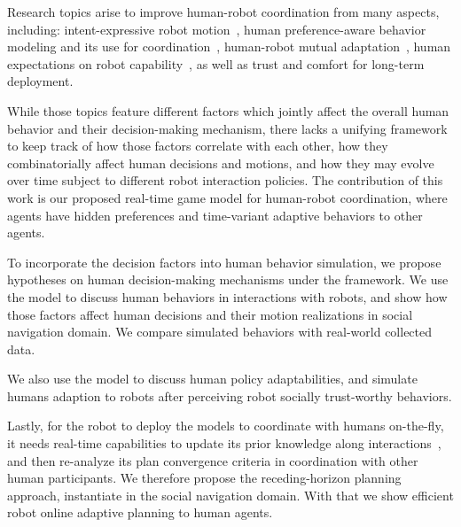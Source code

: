 \documentclass[letterpaper, 10 pt, conference]{ieeeconf}  %
\begin{document}
Research topics arise 
to improve human-robot coordination from many aspects, including: intent-expressive robot 
motion~\cite{dragan2013legibility,lichtenthaler2012influence}, human 
preference-aware behavior modeling and its 
use for coordination~\cite{gombolay2015coordination,dorsa2017active}, human-robot mutual 
adaptation~\cite{nikolaidis2013human,nikolaidis2016formalizing}, human 
expectations on robot capability~\cite{cha2015perceived,kwon2016human}, as well as trust and comfort for long-term 
deployment\cite{yang2017evaluting}. 

While those topics feature different factors which jointly affect the overall human behavior and 
their decision-making mechanism, 
there lacks a unifying framework to keep track of how those factors correlate with 
each other, how they combinatorially affect human decisions and motions, and 
how they may evolve over time subject to different robot interaction policies. 
The contribution of this work is our proposed real-time game 
model for human-robot coordination, 
where agents have hidden preferences and time-variant adaptive behaviors to 
other agents.

To incorporate the decision factors into human behavior simulation, 
we propose hypotheses on human decision-making mechanisms under the framework. 
We use the model to discuss human behaviors in interactions with robots, and 
show how those factors affect human decisions and their motion realizations in 
social navigation domain. We compare simulated behaviors with real-world collected 
data. 

We also use the model to discuss human policy adaptabilities,
and simulate humans adaption to robots after perceiving robot socially trust-worthy behaviors. 

Lastly, for the robot to deploy the models to coordinate with humans 
on-the-fly, it needs real-time 
capabilities to update its prior knowledge 
along interactions~\cite{sezer2015towards,bai2015intention}, 
and then re-analyze its plan convergence criteria in coordination with other 
human participants. We therefore propose the 
receding-horizon planning approach, instantiate in the social 
navigation domain. With that we show efficient robot online adaptive planning 
to human 
agents.   

\end{document}
